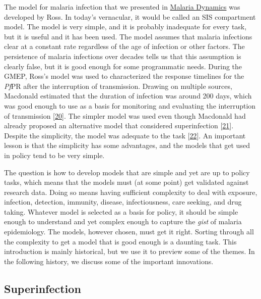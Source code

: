 \documentclass[
]{book}
\begin{document}
The model for malaria infection that we presented in \protect\hyperlink{malaria-dynamics}{Malaria Dynamics} was developed by Ross. In today's vernacular, it would be called an SIS compartment model. The model is very simple, and it is probably inadequate for every task, but it is useful and it has been used. The model assumes that malaria infections clear at a constant rate regardless of the age of infection or other factors. The persistence of malaria infections over decades tells us that this assumption is clearly false, but it is good enough for some programmatic needs. During the GMEP, Ross's model was used to characterized the response timelines for the \emph{Pf}PR after the interruption of transmission. Drawing on multiple sources, Macdonald estimated that the duration of infection was around 200 days, which was good enough to use as a basis for monitoring and evaluating the interruption of transmission {[}\protect\hyperlink{ref-MacdonaldG1964MalariaParasite}{20}{]}. The simpler model was used even though Macdonald had already proposed an alternative model that considered superinfection {[}\protect\hyperlink{ref-MacdonaldG1950_Superinfection}{21}{]}. Despite the simplicity, the model was adequate to the task {[}\protect\hyperlink{ref-SmithDL2009EndemicityResponse}{22}{]}. An important lesson is that the simplicity has some advantages, and the models that get used in policy tend to be very simple.

The question is how to develop models that are simple and yet are up to policy tasks, which means that the models must (at some point) get validated against research data. Doing so means having sufficient complexity to deal with exposure, infection, detection, immunity, disease, infectiousness, care seeking, and drug taking. Whatever model is selected as a basis for policy, it should be simple enough to understand and yet complex enough to capture the \emph{gist} of malaria epidemiology. The models, however chosen, must get it right. Sorting through all the complexity to get a model that is good enough is a daunting task. This introduction is mainly historical, but we use it to preview some of the themes. In the following history, we discuss some of the important innovations.

\hypertarget{superinfection}{%
\subsection{Superinfection}\label{superinfection}}
\end{document}
